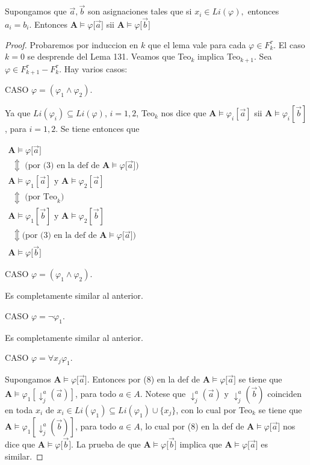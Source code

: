   \begin{lemma}
    Supongamos que \(\vec{a},\vec{b}\) son asignaciones tales que si \(x_{i}\in Li(\varphi ),\) entonces \(a_{i}=b_{i}.\) Entonces \( \mathbf{A}\models \varphi \lbrack \vec{a}]\) sii \(\mathbf{A}\models \varphi \lbrack \vec{b}]\)
  \end{lemma}
  \begin{proof}
    Probaremos por induccion en \(k\) que el lema vale para cada \(\varphi \in F_{k}^{\tau }.\) El caso \(k=0\) se desprende del Lema 131. Veamos que Teo\(_{k}\) implica Teo\(_{k+1}.\) Sea \(\varphi \in F_{k+1}^{\tau }-F_{k}^{\tau }.\) Hay varios casos:

    CASO \(\varphi =(\varphi _{1}\wedge \varphi _{2})\).

    Ya que \(Li(\varphi _{i})\subseteq Li(\varphi )\), \(i=1,2\), Teo\(_{k}\) nos dice que \(\mathbf{A}\models \varphi _{i}[\vec{a}]\) sii \(\mathbf{A} \models \varphi _{i}[\vec{b}]\), para \(i=1,2\). Se tiene entonces que

    \(\displaystyle \begin{array}{l} \mathbf{A}\models \varphi \lbrack \vec{a}] \\ \ \ \Updownarrow \text{ (por (3) en la def de }\mathbf{A}\models \varphi \lbrack \vec{a}]\text{)} \\ \mathbf{A}\models \varphi _{1}[\vec{a}]\text{ y }\mathbf{A}\models \varphi _{2}[\vec{a}] \\ \ \ \Updownarrow \text{ (por Teo}_{k}\text{)} \\ \mathbf{A}\models \varphi _{1}[\vec{b}]\text{ y }\mathbf{A}\models \varphi _{2}[\vec{b}] \\ \ \ \Updownarrow \text{(por (3) en la def de }\mathbf{A}\models \varphi \lbrack \vec{a}]\text{)} \\ \mathbf{A}\models \varphi \lbrack \vec{b}] \end{array} \)

    CASO \(\varphi =(\varphi _{1}\wedge \varphi _{2})\).

    Es completamente similar al anterior.

    CASO \(\varphi =\lnot \varphi _{1}.\)

    Es completamente similar al anterior.

    CASO \(\varphi =\forall x_{j}\varphi _{1}.\)

    Supongamos \(\mathbf{A}\models \varphi \lbrack \vec{a}]\). Entonces por (8) en la def de \(\mathbf{A}\models \varphi \lbrack \vec{a}]\) se tiene que \(\mathbf{A}\models \varphi _{1}[\downarrow _{j}^{a}(\vec{a})]\), para todo \(a\in A\). Notese que \(\downarrow _{j}^{a}(\vec{a})\) y \(\downarrow _{j}^{a}(\vec{b})\) coinciden en toda \(x_{i}\) de \(x_{i}\in Li(\varphi _{1})\subseteq Li(\varphi _{1})\cup \{x_{j}\}\), con lo cual por Teo\(_{k}\) se tiene que \(\mathbf{A}\models \varphi _{1}[\downarrow _{j}^{a}(\vec{b})]\), para todo \(a\in A\), lo cual por (8) en la def de \(\mathbf{A}\models \varphi \lbrack \vec{a}]\) nos dice que \(\mathbf{A}\models \varphi \lbrack \vec{b}]\). La prueba de que \(\mathbf{A}\models \varphi \lbrack \vec{b}]\) implica que \( \mathbf{A}\models \varphi \lbrack \vec{a}]\) es similar.


\end{proof}
